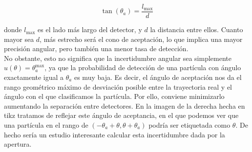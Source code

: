 \documentclass[11pt]{article}
\begin{document}
\begin{equation}
	\tan (\theta_a) = \frac{l_{\max}}{d}
\end{equation}
\begin{minipage}[t]{0.64\linewidth}
donde $l_{\max}$ es el lado más largo del detector, y $d$ la distancia entre ellos. Cuanto mayor sea $d$, más estrecho será el cono de aceptación, lo que implica una mayor precisión angular, pero también una menor tasa de detección. \\[0.1em]

No obstante, esto no significa que la incertidumbre angular sea simplemente $u(\theta) = \theta_a^{\max}$, ya que la probabilidad de detección de una partícula con ángulo exactamente igual a $\theta_a$ es muy baja. Es decir, el ángulo de aceptación nos da el rango geométrico máximo de desviación posible entre la trayectoria real y el ángulo con el que clasificamos la partícula. Por ello, conviene minimizarlo aumentando la separación entre detectores. En la imagen  de la derecha hecha en tikz tratamos de reflejar este ángulo de aceptancia, en el que podemos ver que una partícula en el rango de $(-\theta_a+\theta,\theta+\theta_a)$ podría ser etiquetada como $\theta$. De hecho sería un estudio interesante calcular esta incertidumbre dada por la apertura. 
\end{minipage}
\hfill
\end{document}
